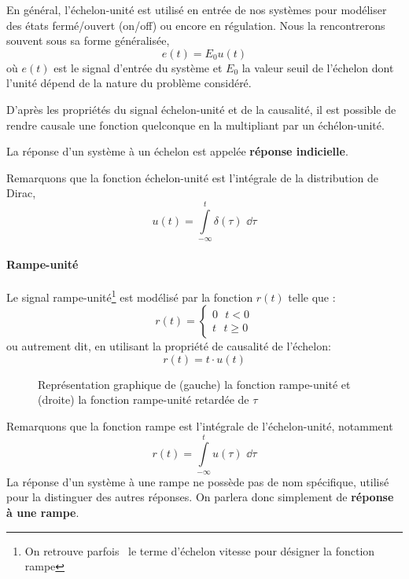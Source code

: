 En général, l'échelon-unité est utilisé en entrée de nos systèmes pour 
modéliser des états fermé/ouvert (\og on/off\fg) ou encore en régulation.
Nous la rencontrerons souvent sous sa forme généralisée, 
$$
e(t)=E_0u(t)
$$
où $e(t)$ est le signal d'entrée du système et $E_0$ la valeur seuil 
de l'échelon dont l'unité dépend de la nature du problème considéré.

D'après les propriétés du signal échelon-unité et de la causalité, il 
est possible de rendre causale une fonction quelconque en la 
multipliant par un échélon-unité.

La réponse d'un système à un échelon est appelée 
\textbf{réponse indicielle}.

Remarquons que la fonction échelon-unité est l'intégrale 
de la distribution de Dirac,
$$
u(t)=\int\limits_{-\infty}^{t} \delta(\tau)\,\,\dd{\tau}
$$

\paragraph{Rampe-unité}
Le signal rampe-unité\footnote{On retrouve parfois~\cite{sueurautomatique} 
le terme d'échelon vitesse pour désigner la fonction rampe} est
modélisé par la fonction $r(t)$ telle que :
$$
r(t)=
\begin{cases}
	0\,\,\,\,t<0 \\
	t\,\,\,\,t\geq0 
\end{cases}
$$
ou autrement dit, en utilisant la propriété de causalité de l'échelon:
$$
r(t)=t\cdot u(t)
$$

\begin{figure}[!h]
\begin{center}

\end{center}
\caption{Représentation graphique de (gauche) la fonction rampe-unité et 
                                     (droite) la fonction rampe-unité retardée
                                     de $\tau$
\label{fig-rampe}}
\end{figure}
Remarquons que la fonction rampe est l'intégrale de l'échelon-unité, notamment 
$$
r(t)=\int\limits_{-\infty}^{t} u(\tau)\,\,\dd{\tau}
$$
La réponse d'un système à une rampe ne possède pas de nom spécifique, 
utilisé pour la distinguer des autres réponses. On parlera donc simplement 
de \textbf{réponse à une rampe}. 

